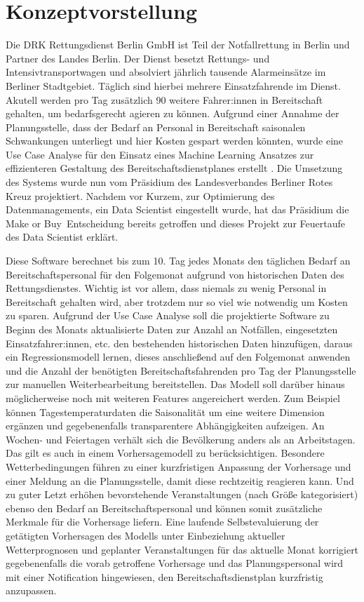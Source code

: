 \chapter{Konzeptvorstellung}

Die DRK Rettungsdienst Berlin GmbH ist Teil der Notfallrettung in Berlin und Partner des Landes Berlin. Der Dienst besetzt Rettungs- und Intensivtransportwagen und absolviert jährlich tausende Alarmeinsätze im Berliner Stadtgebiet. Täglich sind hierbei mehrere Einsatzfahrende im Dienst. Akutell werden pro Tag zusätzlich 90 weitere Fahrer:innen in Bereitschaft gehalten, um bedarfsgerecht agieren zu können. Aufgrund einer Annahme der Planungsstelle, dass der Bedarf an Personal in Bereitschaft saisonalen Schwankungen unterliegt und hier Kosten gespart werden könnten, wurde eine Use Case Analyse für den Einsatz eines Machine Learning Ansatzes zur effizienteren Gestaltung des Bereitschaftsdienstplanes erstellt \citep{grunsky_rettungsdienst_2024}. Die Umsetzung des Systems wurde nun vom Präsidium des Landesverbandes Berliner Rotes Kreuz projektiert. Nachdem vor Kurzem, zur Optimierung des Datenmanagements, ein Data Scientist eingestellt wurde, hat das Präsidium die \glqq Make or Buy\grqq\ Entscheidung bereits getroffen und dieses Projekt zur Feuertaufe des Data Scientist erklärt.

Diese Software berechnet bis zum 10. Tag jedes Monats den täglichen Bedarf an Bereitschaftspersonal für den Folgemonat aufgrund von historischen Daten des Rettungsdienstes. Wichtig ist vor allem, dass niemals zu wenig Personal in Bereitschaft gehalten wird, aber trotzdem nur so viel wie notwendig um Kosten zu sparen. Aufgrund der Use Case Analyse soll die projektierte Software zu Beginn des Monats aktualisierte Daten zur Anzahl an Notfällen, eingesetzten Einsatzfahrer:innen, etc. den bestehenden historischen Daten hinzufügen, daraus ein Regressionsmodell lernen, dieses anschließend auf den Folgemonat anwenden und die Anzahl der benötigten Bereitschaftsfahrenden pro Tag der Planungsstelle zur manuellen Weiterbearbeitung bereitstellen. Das Modell soll darüber hinaus möglicherweise noch mit weiteren Features angereichert werden. Zum Beispiel können Tagestemperaturdaten die Saisonalität um eine weitere Dimension ergänzen und gegebenenfalls transparentere Abhängigkeiten aufzeigen. An Wochen- und Feiertagen verhält sich die Bevölkerung anders als an Arbeitstagen. Das gilt es auch in einem Vorhersagemodell zu berücksichtigen. Besondere Wetterbedingungen führen zu einer kurzfristigen Anpassung der Vorhersage und einer Meldung an die Planungsstelle, damit diese rechtzeitig reagieren kann. Und zu guter Letzt erhöhen bevorstehende Veranstaltungen (nach Größe kategorisiert) ebenso den Bedarf an Bereitschaftspersonal und können somit zusätzliche Merkmale für die Vorhersage liefern.
Eine laufende Selbstevaluierung der getätigten Vorhersagen des Modells unter Einbeziehung aktueller Wetterprognosen und geplanter Veranstaltungen für das aktuelle Monat korrigiert gegebenenfalls die vorab getroffene Vorhersage und das Planungspersonal wird mit einer Notification hingewiesen, den Bereitschaftsdienstplan kurzfristig anzupassen.

